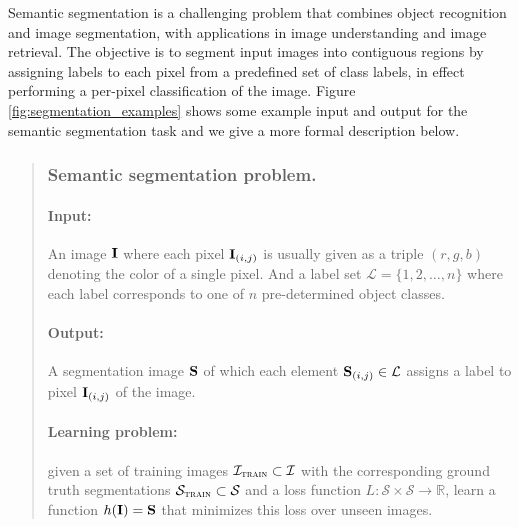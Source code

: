 Semantic segmentation is a challenging problem that combines object recognition and image segmentation, with applications in image understanding and image retrieval. The objective is to segment input images into contiguous regions by assigning labels to each pixel from a predefined set of class labels, in effect performing a per-pixel classification of the image. Figure \ref{fig:segmentation_examples} shows some example input and output for the semantic segmentation task and we give a more formal description below.



\begin{quotation}
\subsubsection*{Semantic segmentation problem.}

\paragraph{Input:} An image $\mathbf{I}$ where each pixel $\mathbf{I}_{(i,j)}$ is usually given as a triple $(r,g,b)$ denoting the color of a single pixel. And a label set $\mathcal{L} = \{1, 2, \ldots, n\}$ where each label corresponds to one of $n$ pre-determined object classes.

\paragraph{Output:} A segmentation image $\mathbf{S}$ of which each element  $\mathbf{S}_{(i,j)} \in \mathcal{L}$ assigns a label to pixel $\mathbf{I}_{(i,j)}$ of the image.

\paragraph{Learning problem:} given a set of training images $\mathcal{I}_\textsc{train} \subset \mathcal{I}$ with the corresponding ground truth segmentations $\mathcal{S}_\textsc{train} \subset \mathcal{S}$ and a loss function $L: \mathcal{S} \times \mathcal{S} \rightarrow \mathbb{R}$, learn a function $h(\mathbf{I}) = \mathbf{S}$ that minimizes this loss over unseen images. %
\end{quotation}


